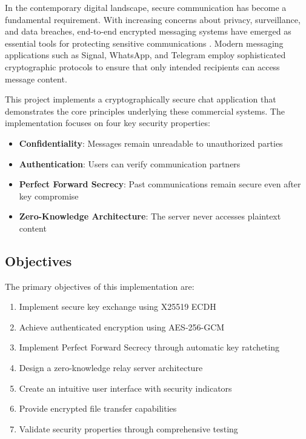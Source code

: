 \documentclass[conference]{IEEEtran}
\begin{document}
In the contemporary digital landscape, secure communication has become a fundamental requirement. With increasing concerns about privacy, surveillance, and data breaches, end-to-end encrypted messaging systems have emerged as essential tools for protecting sensitive communications \cite{marlinspike2016}. Modern messaging applications such as Signal, WhatsApp, and Telegram employ sophisticated cryptographic protocols to ensure that only intended recipients can access message content.

This project implements a cryptographically secure chat application that demonstrates the core principles underlying these commercial systems. The implementation focuses on four key security properties:

\begin{itemize}
    \item \textbf{Confidentiality}: Messages remain unreadable to unauthorized parties
    \item \textbf{Authentication}: Users can verify communication partners
    \item \textbf{Perfect Forward Secrecy}: Past communications remain secure even after key compromise
    \item \textbf{Zero-Knowledge Architecture}: The server never accesses plaintext content
\end{itemize}

\subsection{Objectives}

The primary objectives of this implementation are:

\begin{enumerate}
    \item Implement secure key exchange using X25519 ECDH
    \item Achieve authenticated encryption using AES-256-GCM
    \item Implement Perfect Forward Secrecy through automatic key ratcheting
    \item Design a zero-knowledge relay server architecture
    \item Create an intuitive user interface with security indicators
    \item Provide encrypted file transfer capabilities
    \item Validate security properties through comprehensive testing
\end{enumerate}
\end{document}
